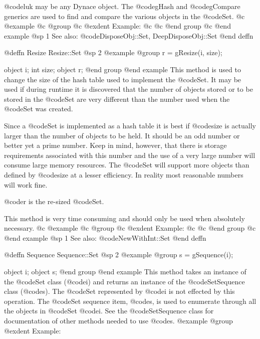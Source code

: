 @code{luk} may be any Dynace object.  The @code{gHash} and
@code{gCompare} generics are used to find and compare the various
objects in the @code{Set}.
@c @example
@c @group
@c @exdent Example:
@c 
@c @end group
@c @end example
@sp 1
See also:  @code{DisposeObj::Set, DeepDisposeObj::Set}
@end deffn













@deffn {Resize} Resize::Set
@sp 2
@example
@group
r = gResize(i, size);

object  i;
int     size;
object  r;
@end group
@end example
This method is used to change the size of the hash table used to
implement the @code{Set}.  It may be used if during runtime it is
discovered that the number of objects stored or to be stored in the
@code{Set} are very different than the number used when the @code{Set}
was created.

Since a @code{Set} is implemented as a hash table it is best if
@code{size} is actually larger than the number of objects to be held.
It should be an odd number or better yet a prime number.  Keep in mind,
however, that there is storage requirements associated with this number
and the use of a very large number will consume large memory resources.
The @code{Set} will support more objects than defined by @code{size} at
a lesser efficiency.  In reality most reasonable numbers will work fine.

@code{r} is the re-sized @code{Set}.

This method is very time consuming and should only be used when
absolutely necessary.
@c @example
@c @group
@c @exdent Example:
@c 
@c @end group
@c @end example
@sp 1
See also:  @code{NewWithInt::Set}
@end deffn











@deffn {Sequence} Sequence::Set
@sp 2
@example
@group
s = gSequence(i);

object  i;
object  s;
@end group
@end example
This method takes an instance of the @code{Set} class (@code{i})
and returns an instance of the @code{SetSequence} class
(@code{s}).  The @code{Set} represented by @code{i} is not effected by
this operation.  The @code{Set} sequence item, @code{s}, is used to enumerate
through all the objects in @code{Set} @code{i}.  See the
@code{SetSequence} class for documentation of other methods
needed to use @code{s}.
@example
@group
@exdent Example:

